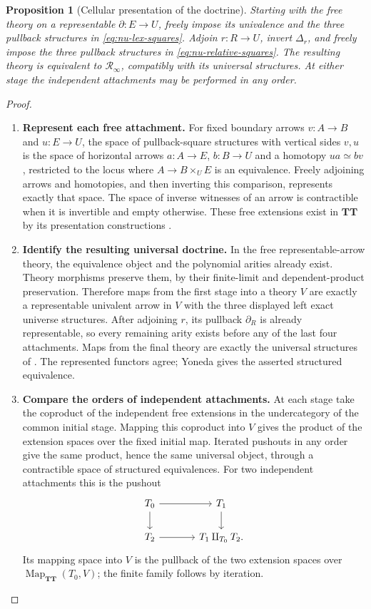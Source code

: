\documentclass[oneside]{article}
\theoremstyle{plain}
\newtheorem{proposition}[theorem]{Proposition}
\theoremstyle{definition}
\theoremstyle{remark}
\newcommand{\Map}{\operatorname{Map}}
\newcommand{\RNU}{\mathcal R_{\infty}}
\newcommand{\TT}{\mathbf{TT}}
\begin{document}
\begin{proposition}[Cellular presentation of the doctrine]\label{prop:nu-cells}
Starting with the free theory on a representable $\partial:E\to U$,
freely impose its univalence and the three pullback structures in
\eqref{eq:nu-lex-squares}. Adjoin $r:R\to U$, invert $\Delta_r$, and
freely impose the three pullback structures in
\eqref{eq:nu-relative-squares}. The resulting theory is equivalent to
$\RNU$, compatibly with its universal structures. At either stage the
independent attachments may be performed in any order.
\end{proposition}
\begin{proof}
\leavevmode
\begin{enumerate}
\item \textbf{Represent each free attachment.} For fixed boundary arrows $v:A\to B$ and $u:E\to U$, the space of
pullback-square structures with vertical sides $v,u$ is the space of
horizontal arrows $a:A\to E$, $b:B\to U$ and a homotopy $ua\simeq bv$,
restricted to the locus where $A\to B\times_U E$ is an equivalence.
Freely adjoining arrows and homotopies, and then inverting this comparison,
represents exactly that space. The space of inverse witnesses of an arrow
is contractible when it is invertible and empty otherwise. These free
extensions exist in $\TT$ by its presentation constructions
\cite[Exs.~3.11--3.12]{NguyenUemura2025}.
\item \textbf{Identify the resulting universal doctrine.} In the free representable-arrow theory, the equivalence object and the
polynomial arities already exist. Theory morphisms preserve them, by their
finite-limit and dependent-product preservation. Therefore maps from the
first stage into a theory $V$ are exactly a representable univalent arrow
in $V$ with the three displayed left exact universe structures. After
adjoining $r$, its pullback $\partial_R$ is already representable, so every
remaining arity exists before any of the last four attachments. Maps from
the final theory are exactly the universal structures of
\cite[Def.~5.27]{NguyenUemura2025}. The represented functors agree;
Yoneda gives the asserted structured equivalence.
\item \textbf{Compare the orders of independent attachments.} At each stage take the coproduct of the independent free extensions in
the undercategory of the common initial stage. Mapping this coproduct into
$V$ gives the product of the extension spaces over the fixed initial map.
Iterated pushouts in any order give the same product, hence the same
universal object, through a contractible space of structured equivalences.
For two independent attachments this is the pushout
\[
\begin{tikzcd}[column sep=large]
 T_0\ar[r]\ar[d]&T_1\ar[d]\\
 T_2\ar[r]&T_1\amalg_{T_0}T_2.
\end{tikzcd}
\]
Its mapping space into $V$ is the pullback of the two extension spaces
over $\Map_{\TT}(T_0,V)$; the finite family follows by iteration.\qedhere
\end{enumerate}
\end{proof}
\end{document}
